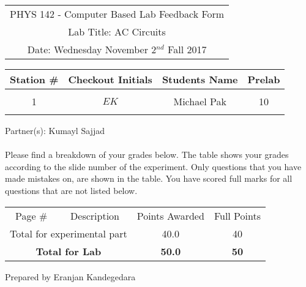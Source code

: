 \documentclass{article}
\begin{document}

\begin{table}[h]
	\centering
	\begin{tabular}{c}
	PHYS 142 - Computer Based Lab Feedback Form\\
	Lab Title: AC Circuits\\Date: Wednesday November 2$^{nd}$ Fall 2017 \\\hline
\end{tabular}
\end{table}
\begin{table}[h]\centering \begin{tabular}{|c|c|p{9.9 cm}|c|}\hline Station \#  & Checkout Initials & \multicolumn{1}{|c|}{Students Name} & Prelab \\\hline\multirow{3}{*}{1}& \multirow{3}{*}{$EK$} & &\\& &\multicolumn{1}{|c|}{Michael Pak}&10\\&   &  &\\\hline
\end{tabular}
\end{table}
Partner(s): Kumayl Sajjad\\
\\Please find a breakdown of your grades below. The table shows your grades according to the slide number of the experiment. Only questions that you have made mistakes on, are shown in the table. You have scored full marks for all questions that are not listed below.

\begin{table}[h!] \centering \label{my-label} \begin{tabular}{|c|p{11.75 cm}|c|c|}\hline
\multirow{2}{1cm}{Page \#}& \multicolumn{1}{|c|}{\multirow{2}{*}{Description}}  & \multirow{2}{1.5 cm}{Points Awarded} & \multirow{2}{1 cm}{Full Points} \\   &  &  &\\\hline
\multicolumn{2}{|c|}{\multirow{1}{*}{Total for experimental part}} &40.0& 40 \\\hline\multicolumn{2}{|c|}{\multirow{2}{*}{\textbf{Total for Lab}}} &\multirow{2}{*}{\textbf{50.0}}& \multirow{2}{*}{\textbf{50}} \\ \multicolumn{2}{|c|}{}&&\\ \hline\hline\end{tabular}
 \end{table}
\clearpage
\null\vfill \begin{center}Prepared by Eranjan Kandegedara\end{center}  \clearpage
\end{document}
